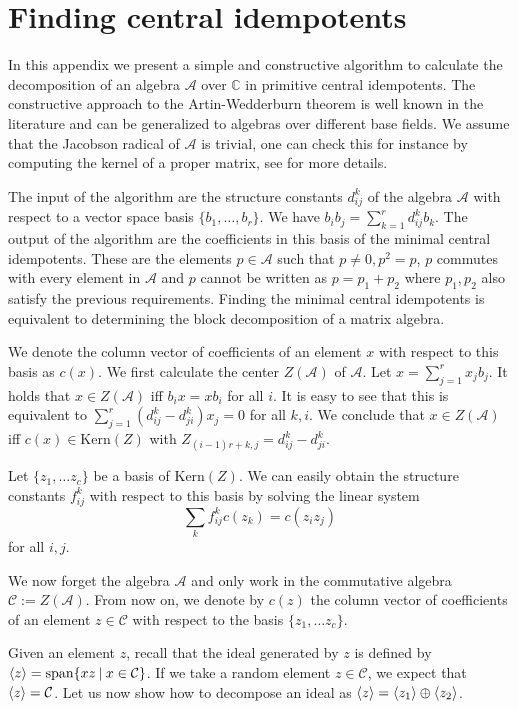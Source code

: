 \documentclass[12 pt]{article}
\begin{document}
\section{Finding central idempotents}\label{app:idempotents}
In this appendix we present a simple and constructive algorithm to calculate the decomposition of an algebra $\mathcal{A}$ over $\mathbb{C}$ in primitive central idempotents. The constructive approach to the Artin-Wedderburn theorem is well known in the literature \cite{friedl1985polynomial} and can be generalized to algebras over different base fields. We assume that the Jacobson radical of $\mathcal{A}$ is trivial, one can check this for instance by computing the kernel of a proper matrix, see \cite{friedl1985polynomial} for more details.

The input of the algorithm are the structure constants $d_{ij}^k$ of the algebra $\mathcal{A}$ with respect to a vector space basis $\{b_1,\dots,b_r\}$. We have $b_ib_j=\sum_{k=1}^rd_{ij}^kb_k$. The output of the algorithm are the coefficients in this basis of the minimal central idempotents. These are the elements $p  \in \mathcal{A}$ such that $p\neq 0, p^2=p$, $p$ commutes with every element in $\mathcal{A}$ and $p$ cannot be written as $p=p_1+p_2$ where $p_1,p_2$ also satisfy the previous requirements. Finding the minimal central idempotents is equivalent to determining the block decomposition of a matrix algebra.


We denote the column vector of coefficients of an element $x$ with respect to this basis as $c(x)$. We first calculate the center $Z(\mathcal{A})$ of $\mathcal{A}$. Let $x = \sum_{j=1}^r x_jb_j$. It holds that $x\in Z(\mathcal{A})$ iff $b_ix=xb_i$ for all $i$. It is easy to see that this is equivalent to $\sum_{j=1}^r(d_{ij}^k-d_{ji}^k)x_j=0$ for all $k,i$. We conclude that $x \in Z(\mathcal{A})$ iff $c(x) \in \text{Kern}(Z)$ with $Z_{(i-1)r+k,j}=d_{ij}^k-d_{ji}^k$.

Let $\{z_1,\ldots z_c\}$ be a basis of $\text{Kern}(Z)$. We can easily obtain the structure constants $f_{ij}^k$ with respect to this basis by solving the linear system
$$
    \sum_k f_{ij}^k c(z_k) = c(z_iz_j)
$$
for all $i,j$.

We now forget the algebra $\mathcal{A}$ and only work in the commutative algebra $\mathcal{C}:=Z(\mathcal{A})$. From now on, we denote by $c(z)$  the column vector of coefficients of an element $z\in \mathcal{C}$ with respect to the basis $\{z_1,\ldots z_c\}$.

Given an element $z$, recall that the ideal generated by $z$ is defined by $\braket{z}=\text{span}\{xz \: | \: x \in \mathcal{C}\}$. If we take a random element $z \in \mathcal{C}$, we expect that $\braket{z}=\mathcal{C}$. Let us now show how to decompose an ideal as $\braket{z} = \braket{z_1} \oplus \braket{z_2}$.
\end{document}
